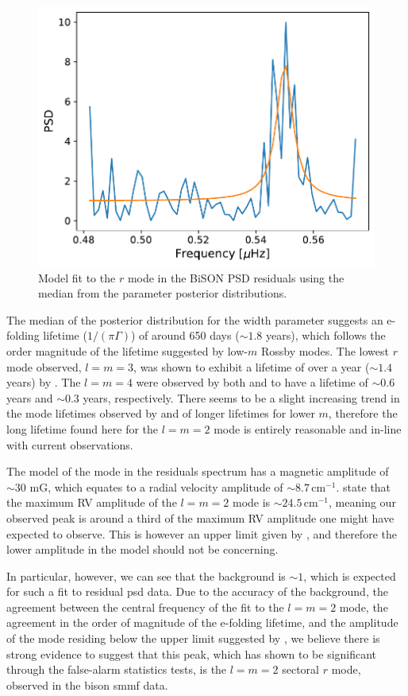 \begin{figure}[!ht]
	\centering
	\includegraphics[width=0.65\columnwidth]{asymm_r-mode_model_fit.pdf}
	\caption{Model fit to the $r$ mode in the BiSON PSD residuals using the median from the parameter posterior distributions.}  \label{fig:rmode_asymm_fit}
\end{figure}

The median of the posterior distribution for the width parameter suggests an e-folding lifetime ($1/(\pi \Gamma)$) of around 650 days ($\sim 1.8$ years), which follows the order magnitude of the lifetime suggested by low-$m$ Rossby modes. The lowest $r$ mode observed, $l=m=3$, was shown to exhibit a lifetime of over a year ($\sim 1.4$ years) by \citet{liang_time-distance_2019}. The $l=m=4$ were observed by both \citet{loptien_global-scale_2018} and \citet{liang_time-distance_2019} to have a lifetime of $\sim 0.6$ years and $\sim 0.3$ years, respectively. There seems to be a slight increasing trend in the mode lifetimes observed by \citet{loptien_global-scale_2018} and \citet{liang_time-distance_2019} of longer lifetimes for lower $m$, therefore the long lifetime found here for the $l=m=2$ mode is entirely reasonable and in-line with current observations.

The model of the mode in the residuals spectrum has a magnetic amplitude of $\sim 30$ mG, which equates to a radial velocity amplitude of $\sim 8.7 \, \mathrm{cm}^{-1}$. \citet{lanza_sectoral_2019} state that the maximum RV amplitude of the $l=m=2$ mode is $\sim 24.5 \,\mathrm{cm}^{-1}$, meaning our observed peak is around a third of the maximum RV amplitude one might have expected to observe. This is however an upper limit given by \citet{lanza_sectoral_2019}, and therefore the lower amplitude in the model should not be concerning.

In particular, however, we can see that the background is $\sim 1$, which is expected for such a fit to residual \gls{psd} data. Due to the accuracy of the background, the agreement between the central frequency of the fit to the $l=m=2$ mode, the agreement in the order of magnitude of the e-folding lifetime, and the amplitude of the mode residing below the upper limit suggested by \citet{lanza_sectoral_2019}, we believe there is strong evidence to suggest that this peak, which has shown to be significant through the false-alarm statistics tests, is the $l=m=2$ sectoral $r$ mode, observed in the \gls{bison} \gls{smmf} data.








